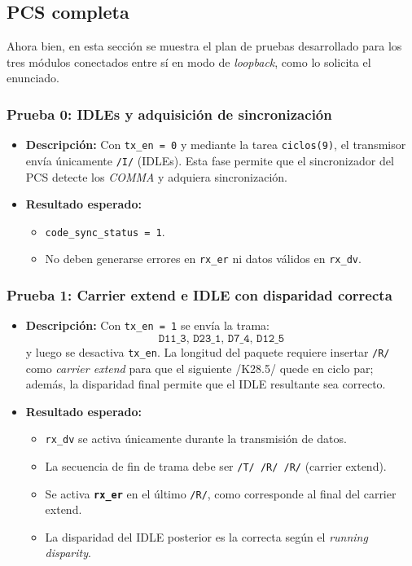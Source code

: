 \subsection{PCS completa}

Ahora bien, en esta sección se muestra el plan de pruebas desarrollado para los tres módulos conectados entre sí en modo de \textit{loopback}, como lo solicita el enunciado.


\subsubsection*{Prueba 0: IDLEs y adquisición de sincronización}

\begin{itemize}
  \item \textbf{Descripción:}  
    Con \texttt{tx\_en = 0} y mediante la tarea \texttt{ciclos(9)}, el transmisor envía únicamente \texttt{/I/} (IDLEs).  
    Esta fase permite que el sincronizador del PCS detecte los \textit{COMMA} y adquiera sincronización.
  \item \textbf{Resultado esperado:}
    \begin{itemize}
      \item \texttt{code\_sync\_status = 1}.
      \item No deben generarse errores en \texttt{rx\_er} ni datos válidos en \texttt{rx\_dv}.
    \end{itemize}
\end{itemize}

\subsubsection*{Prueba 1: Carrier extend e IDLE con disparidad correcta}

\begin{itemize}
  \item \textbf{Descripción:}  
    Con \texttt{tx\_en = 1} se envía la trama:
    \[
      \texttt{D11\_3,\ D23\_1,\ D7\_4,\ D12\_5}
    \]
    y luego se desactiva \texttt{tx\_en}.  
    La longitud del paquete requiere insertar \texttt{/R/} como \emph{carrier extend} para que el siguiente /K28.5/ quede en ciclo par; además, la disparidad final permite que el IDLE resultante sea correcto.
  \item \textbf{Resultado esperado:}
    \begin{itemize}
      \item \texttt{rx\_dv} se activa únicamente durante la transmisión de datos.
      \item La secuencia de fin de trama debe ser \texttt{/T/ /R/ /R/} (carrier extend).
      \item Se activa \textbf{\texttt{rx\_er}} en el último \texttt{/R/}, como corresponde al final del carrier extend.
      \item La disparidad del IDLE posterior es la correcta según el \emph{running disparity}.
    \end{itemize}
\end{itemize}

